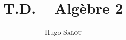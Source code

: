 \documentclass{../../td}
\title{T.D. -- Algèbre 2}
\author{Hugo \textsc{Salou}}
\begin{document}
  \maketitle

  \dominitoc
  \tableofcontents

  \pagebreak

  
\end{document}
